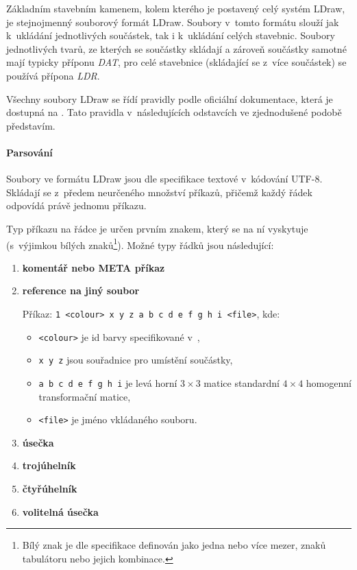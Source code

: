     Základním stavebním kamenem, kolem kterého je postavený celý systém LDraw, je stejnojmenný souborový formát LDraw. Soubory v~tomto formátu slouží jak k~ukládání jednotlivých součástek, tak i k~ukládání celých stavebnic. Soubory jednotlivých tvarů, ze kterých se součástky skládají a zároveň součástky samotné mají typicky příponu \textit{DAT}, pro celé stavebnice (skládající se z~více součástek) se používá přípona \textit{LDR}.
    
    Všechny soubory LDraw se řídí pravidly podle oficiální dokumentace, která je dostupná na \autocite{ldraw:file:documentation}. Tato pravidla v~následujících odstavcích ve zjednodušené podobě představím.

        \paragraph{Parsování}\mbox{}

        Soubory ve formátu LDraw jsou dle specifikace \autocite{ldraw:file:specification} textové v~kódování \gls{UTF-8}. Skládají se z~předem neurčeného množství příkazů, přičemž každý řádek odpovídá právě jednomu příkazu.

        Typ příkazu na řádce je určen prvním znakem, který se na ní vyskytuje (s~výjimkou bílých znaků\footnote{Bílý znak je dle specifikace \autocite{ldraw:file:specification} definován jako jedna nebo více mezer, znaků tabulátoru nebo jejich kombinace.}). Možné typy řádků jsou následující: 
        
        \begin{enumerate}
            \item[0:] \textbf{komentář nebo META příkaz}

            \item[1:] \textbf{reference na jiný soubor}

                Příkaz: \texttt{1 <colour> x y z a b c d e f g h i <file>}, kde: 
                \begin{itemize}
                    \item \texttt{<colour>} je id barvy specifikované v~\autocite{ldraw:colors},
                    \item \texttt{x y z} jsou souřadnice pro umístění součástky,
                    \item \texttt{a b c d e f g h i} je levá horní $ 3\times3 $ matice standardní $ 4\times4 $ homogenní transformační matice,
                    \item \texttt{<file>} je jméno vkládaného souboru.
                \end{itemize}
                
            \item[2:] \textbf{úsečka}
            \item[3:] \textbf{trojúhelník}
            \item[4:] \textbf{čtyřúhelník}
            \item[5:] \textbf{volitelná úsečka}
        \end{enumerate}

